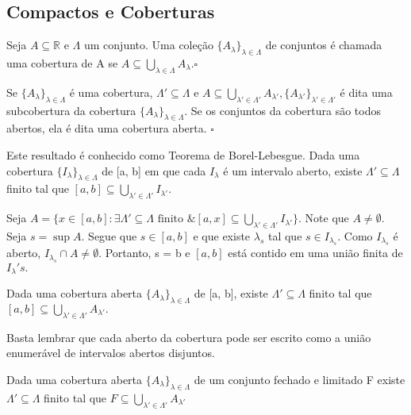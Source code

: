 \documentclass[Analysis/analysis_notes.tex]{subfiles}
\begin{document}
\subsection{Compactos e Coberturas}
\begin{def*}
	Seja $A\subseteq{\mathbb{R}}$ e $\Lambda $ um conjunto. Uma coleção $\{A_{\lambda }\}_{\lambda \in\Lambda }$ de conjuntos
	é chamada uma cobertura de A se $A\subseteq{\bigcup_{\lambda \in\Lambda }^{}{A_{\lambda }}}.\square$
\end{def*}
\begin{def*}
	Se $\{A_{\lambda }\}_{\lambda \in\Lambda }$ é uma cobertura, $\Lambda '\subseteq{\Lambda }$ e $A\subseteq{\bigcup_{\lambda '\in\Lambda '}^{}{A_{\lambda '}}},
		\{A_{\lambda '}\}_{\lambda '\in\Lambda '}$ é dita uma subcobertura da cobertura $\{A_{\lambda }\}_{\lambda \in\Lambda }.$
	Se os conjuntos da cobertura são todos abertos, ela é dita uma cobertura aberta. $\square$
\end{def*}
\begin{theorem*}
	Este resultado é conhecido como Teorema de Borel-Lebesgue. Dada uma cobertura $\{I_{\lambda }\}_{\lambda \in\Lambda }$ de [a, b]
	em que cada $I_{\lambda }$ é um intervalo aberto, existe $\Lambda '\subseteq{\Lambda }$ finito tal que $[a, b]\subseteq{\bigcup_{\lambda '\in\Lambda '}^{}{I_{\lambda '}.}}$
\end{theorem*}
\begin{proof*}
	Seja $A=\{x\in[a,b]: \exists \Lambda'\subseteq{\Lambda }\text{ finito }\&[a,x]\subseteq{\bigcup_{\lambda '\in\Lambda '}^{}{I_{\lambda '}}}\}$.
	Note que $A \neq\emptyset.$ Seja $s=\sup{A}.$ Segue que $s\in[a, b]$ e que existe $\lambda _{s}$ tal que $s\in I_{\lambda _{s}}.$
	Como $I_{\lambda _{s}}$ é aberto, $I_{\lambda _{s}}\cap A \neq\emptyset$. Portanto, s = b e $[a, b]$ está contido em uma
	união finita de $I_{\lambda }'s.$ \qedsymbol
\end{proof*}
\begin{crl*}
	Dada uma cobertura aberta $\{A_{\lambda }\}_{\lambda \in\Lambda }$ de [a, b], existe $\Lambda '\subseteq{\Lambda }$ finito
	tal que $[a,b]\subseteq{\bigcup_{\lambda '\in\Lambda '}^{}{A_{\lambda'}}}.$
\end{crl*}
Basta lembrar que cada aberto da cobertura pode ser escrito como a união enumerável de intervalos abertos disjuntos.
\begin{crl*}
	Dada uma cobertura aberta $\{A_{\lambda }\}_{\lambda \in\Lambda }$ de um conjunto fechado e limitado F existe $\Lambda '\subseteq{\Lambda }$
	finito tal que $F\subseteq{\bigcup_{\lambda '\in\Lambda '}^{}{A_{\lambda '}}}$
\end{crl*}
\end{document}
